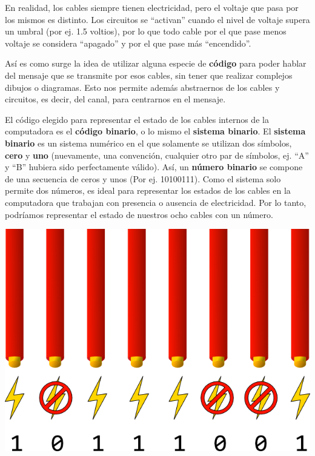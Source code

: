 \begin{knowwhat}[En realidad]
En realidad, los cables siempre tienen electricidad, pero el voltaje que pasa
por los mismos es distinto. Los circuitos se ``activan'' cuando el nivel de
voltaje supera un umbral (por ej. 1.5 voltios), por lo que todo cable por el que
pase menos voltaje se considera ``apagado'' y por el que pase más ``encendido''.
\end{knowwhat}

Así es como surge la idea de utilizar alguna especie de \textbf{código} para
poder hablar del mensaje que se transmite por esos cables, sin tener que
realizar complejos dibujos o diagramas. Esto nos permite además abstraernos de
los cables y circuitos, es decir, del canal, para centrarnos en el mensaje.

 El
código elegido para representar el estado de los cables internos de la
computadora es el \textbf{código binario}, o lo mismo el \textbf{sistema
binario}. El \textbf{sistema binario} es un sistema numérico en el que solamente
se utilizan dos símbolos, \textbf{cero} y \textbf{uno} (nuevamente, una
convención, cualquier otro par de símbolos, ej. ``A'' y ``B'' hubiera sido
perfectamente válido). Así, un \textbf{número binario} se compone de una
secuencia de ceros y unos (Por ej. 10100111). Como el sistema solo permite dos
números, es ideal para representar los estados de los cables en la computadora
que trabajan con presencia o ausencia de electricidad. Por lo tanto, podríamos
representar el estado de nuestros ocho cables con un número.

\centerline{\includegraphics[]{unidades/2_informacion/1_bajo_nivel/imagenes/binary_cables_electricity.png}}

